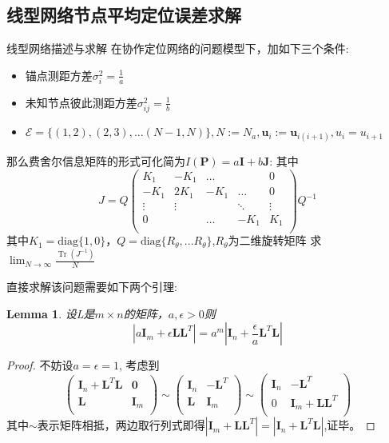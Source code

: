 \documentclass[notheorems,xetex,mathserif,serif]{beamer}
\DeclareMathOperator{\Tr}{Tr}
\newtheorem{lemma}{Lemma}
\begin{document}
\subsection{线型网络节点平均定位误差求解}
\begin{frame}{线型网络描述与求解}
在协作定位网络的问题模型下，加如下三个条件:
\begin{itemize}
\item 锚点测距方差$\sigma_i^2=\frac{1}{a}$
\item 未知节点彼此测距方差$\sigma^2_{ij}=\frac{1}{b}$
\item $\mathcal{E}=\{(1,2),(2,3),...(N-1,N)\},N:=N_a,\bm{u}_i:=\bm{u}_{i(i+1)},u_i=u_{i+1}$
\end{itemize}
那么费舍尔信息矩阵的形式可化简为$I(\bm{P})=a\bm{I}+b\bm{J}$:
其中\[
J=Q\left(
\begin{array}{ccccc}
K_1&-K_1&\dots&&0\\
-K_1&2K_1&-K_1&\dots&0\\
\vdots &\vdots&&\ddots &\vdots\\
0&&\dots&-K_1&K_1\\
\end{array}
\right)Q^{-1}
\]
其中$K_1=\text{diag}\{1,0\}$，$Q=\text{diag}\{R_{\theta},...R_{\theta}\}$,$R_{\theta}$为二维旋转矩阵
求$\lim_{N\to \infty}\frac{\Tr(J^{-1})}{N}$
\end{frame}
\begin{frame}
直接求解该问题需要如下两个引理:
\begin{lemma}\label{lemma:change}
设L是$m\times n$的矩阵，$a,\epsilon > 0$则
\begin{equation}
|a\bm{I}_m+\epsilon \bm{L}\bm{L}^T|=a^m|\bm{I}_n+\frac{\epsilon}{a} \bm{L}^T\bm{L}|
\end{equation}
\end{lemma}
\begin{proof}
不妨设$a=\epsilon=1$,
考虑到
\[
\left(\begin{array}{cc}
\bm{I}_n+\bm{L}^T\bm{L}&\bm{0}\\
\bm{L}&\bm{I}_m\\
\end{array}\right)\sim\left(\begin{array}{cc}
\bm{I}_n&-\bm{L}^T\\
\bm{L}&\bm{I}_m\\
\end{array}\right)\sim\left(\begin{array}{cc}
\bm{I}_n&-\bm{L}^T\\
0&\bm{I}_m+\bm{L}\bm{L}^T\\
\end{array}\right)
\]
其中$\sim$表示矩阵相抵，两边取行列式即得$|\bm{I}_m+\bm{L}\bm{L}^T|=|\bm{I}_n+\bm{L}^T\bm{L}|$,证毕。
\end{proof}
\end{frame}
\end{document}
